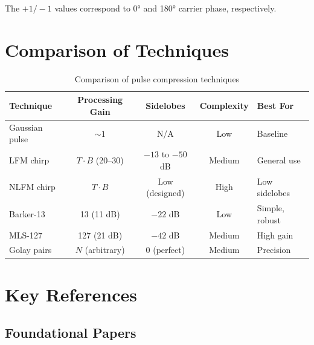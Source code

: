 \documentclass[11pt]{article}
\begin{document}
The $+1/-1$ values correspond to 0° and 180° carrier phase, respectively.

\section{Comparison of Techniques}

\begin{table}[h]
\centering
\begin{tabular}{lcccl}
\toprule
\textbf{Technique} & \textbf{Processing Gain} & \textbf{Sidelobes} & \textbf{Complexity} & \textbf{Best For} \\
\midrule
Gaussian pulse & $\sim 1$ & N/A & Low & Baseline \\
LFM chirp & $T \cdot B$ (20--30) & $-13$ to $-50$ dB & Medium & General use \\
NLFM chirp & $T \cdot B$ & Low (designed) & High & Low sidelobes \\
Barker-13 & 13 (11 dB) & $-22$ dB & Low & Simple, robust \\
MLS-127 & 127 (21 dB) & $-42$ dB & Medium & High gain \\
Golay pairs & $N$ (arbitrary) & 0 (perfect) & Medium & Precision \\
\bottomrule
\end{tabular}
\caption{Comparison of pulse compression techniques}
\end{table}

\section{Key References}

\subsection{Foundational Papers}
\end{document}
